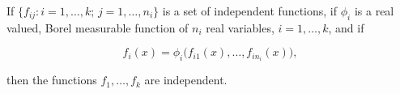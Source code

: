 If $\{f_{ij} : i = 1, \dots, k; \, j = 1, \dots, n_i\}$ is a set of independent functions, if $\phi_i$ is a real valued, Borel measurable function of $n_i$ real variables, $i = 1, \dots, k$, and if

$$f_i(x) = \phi_i\bigl(f_{i1}(x), \dots, f_{in_i}(x)\bigr),$$

then the functions $f_1, \dots, f_k$ are independent.
